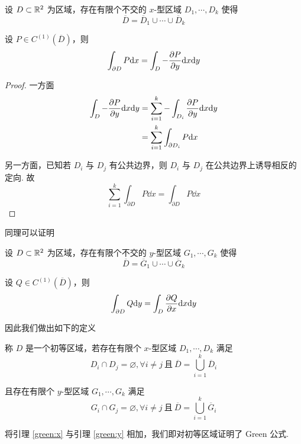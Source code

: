 \begin{lemma}\label{green:x}
    设 $D\subset\mathbb{R}^2$ 为区域，存在有限个不交的 $x$-型区域 $D_1,\cdots,D_k$ 使得 
$$
\overline{D}=\overline{D}_1\cup\cdots\cup\overline{D}_k
$$

    设 $P\in C^{(1)}(\overline{D})$，则
$$
\int_{\partial D}P\mathrm{d} x=\int_D-\frac{\partial{P}}{\partial{y}}\mathrm{d} x\mathrm{d} y
$$
\end{lemma}
\begin{proof}
    一方面
$$
\begin{aligned}
    \int_D-\frac{\partial{P}}{\partial{y}}\mathrm{d} x\mathrm{d} y&=\sum_{i=1}^k-\int_{D_i}\frac{\partial{P}}{\partial{y}}\mathrm{d} x\mathrm{d} y\\
    &=\sum_{i=1}^k\int_{\partial D_i}P\mathrm{d} x
\end{aligned}
$$

    另一方面，已知若 $D_i$ 与 $D_j$ 有公共边界，则 $D_i$ 与 $D_j$ 在公共边界上诱导相反的定向. 故
$$
\sum_{i=1}^k\int_{\partial D}P\dd x=\int_{\partial D}P\dd x
$$
\end{proof}


同理可以证明

\begin{lemma}\label{green:y}
    设 $D\subset\mathbb{R}^2$ 为区域，存在有限个不交的 $y$-型区域 $G_1,\cdots,G_k$ 使得 
$$
\overline{D}=\overline{G}_1\cup\cdots\cup\overline{G}_k
$$

    设 $Q\in C^{(1)}(\overline{D})$，则
$$
\int_{\partial D}Q\mathrm{d} y=\int_D\frac{\partial{Q}}{\partial{x}}\mathrm{d} x\mathrm{d} y
$$
\end{lemma}

因此我们做出如下的定义

\begin{definition}
    称 $D$ 是一个初等区域，若存在有限个 $x$-型区域 $D_1,\cdots,D_k$ 满足
$$
D_i\cap D_j=\varnothing,\forall i\ne j~\text{且}~\overline{D}=\bigcup_{i=1}^k\overline{D}_i
$$

    且存在有限个 $y$-型区域 $G_1,\cdots,G_k$ 满足
$$
    G_i\cap G_j=\varnothing,\forall i\ne j~\text{且}~\overline{D}=\bigcup_{i=1}^k\overline{G}_i
$$
\end{definition}


将引理 \ref{green:x} 与引理 \ref{green:y} 相加，我们即对初等区域证明了 Green 公式.

